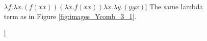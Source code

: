 \begin{figure}[htbp]
{	}
	\caption
	[$\lambda f.\lambda x.(f (x x)) (\lambda x.f (x x)) \lambda x.\lambda y.(y y x)$]
	{The same lambda term as in Figure \ref{fig:images_Ycomb_3_1}.}
	\label{fig:images_Ycomb_3_2}
\end{figure}


